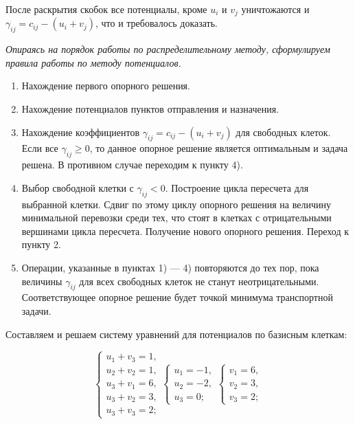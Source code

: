 После раскрытия скобок все потенциалы, кроме $u_i$ и $v_j$ уничтожаются и $\gamma_{ij} = c_{ij} - (u_i + v_j)$, что и требовалось доказать.

{\it Опираясь на порядок работы по распределительному методу, сформулируем правила работы по методу потенциалов.}

\begin{enumerate}
\item Нахождение первого опорного решения.
\item Нахождение потенциалов пунктов отправления и назначения.
\item Нахождение коэффициентов $\gamma_{ij} = c_{ij} - (u_i + v_j)$ для свободных клеток. Если все $\gamma_{ij} \ge 0$, то данное опорное решение является оптимальным и задача решена. В противном случае переходим к пункту 4).
\item  Выбор свободной клетки с $\gamma_{ij} < 0$. Построение цикла пересчета для выбранной клетки. Сдвиг по этому циклу опорного решения на величину минимальной перевозки среди тех, что стоят в клетках с отрицательными вершинами цикла пересчета. Получение нового опорного решения. Переход к пункту 2.
\item Операции, указанные в пунктах 1) — 4) повторяются до тех пор, пока величины $\gamma_{ij}$ для всех свободных клеток не станут неотрицательными. Соответствующее опорное решение будет точкой минимума транспортной задачи.
\end{enumerate}


\begin{figure}[h]
\end{figure}

Составляем и решаем систему уравнений для потенциалов по базисным клеткам:

$$\begin{cases}
u_1 + v_3 = 1,\\u_2 + v_2 = 1,\\u_3 + v_1 = 6,\\u_3 + v_2 = 3,\\u_3 + v_3 = 2;
\end{cases}
\begin{cases}
u_1 = -1,\\u_2 = -2,\\ u_3 = 0;
\end{cases}
\begin{cases}
v_1 = 6,\\v_2 = 3,\\v_3 = 2;
\end{cases}$$

